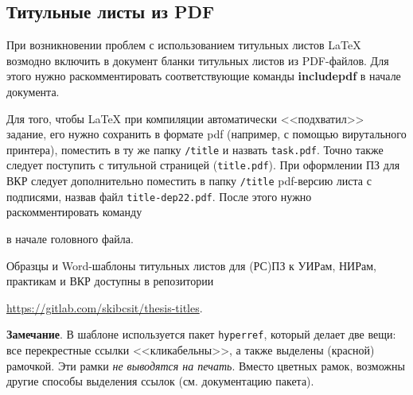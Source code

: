 \subsection{Титульные листы из PDF}

При возникновении проблем с использованием титульных листов \LaTeX{} возмодно
включить в документ бланки титульных листов из PDF-файлов. Для этого нужно
раскомментировать соответствующие команды \textbf{includepdf} в начале
документа.

Для того, чтобы \LaTeX{} при компиляции автоматически <<подхватил>> задание, его
нужно сохранить в формате pdf (например, с помощью вирутального принтера),
поместить в ту же папку \texttt{/title} и назвать \texttt{task.pdf}. Точно также
следует поступить с титульной страницей (\texttt{title.pdf}). При оформлении ПЗ
для ВКР следует дополнительно поместить в папку \texttt{/title} pdf-версию листа
с подписями, назвав файл \texttt{title-dep22.pdf}. После этого нужно
раскомментировать команду
\begin{center}
  \verb||
\end{center}
в начале головного файла.

Образцы и Word-шаблоны титульных листов для (РС)ПЗ к УИРам, НИРам, практикам и
ВКР доступны в репозитории
\begin{center}
  \url{https://gitlab.com/skibcsit/thesis-titles}.
\end{center}  

\textbf{Замечание}. В шаблоне используется пакет \texttt{hyperref}, который
делает две вещи: все перекрестные ссылки <<кликабельны>>, а также выделены
(красной) рамочкой. Эти рамки \textit{не выводятся на печать}. Вместо цветных
рамок, возможны другие способы выделения ссылок (см. документацию пакета).
